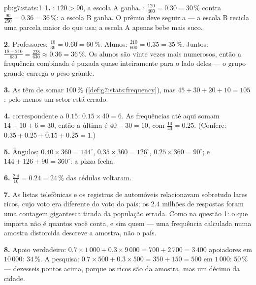 \begin{solution}{pb:g7:stats:1}
\textbf{1.} : $120 > 90$, a escola A ganha.
: $\frac{120}{400} = 0.30 = 30\,\%$ contra
$\frac{90}{250} = 0.36 = 36\,\%$: a escola B ganha. O prêmio deve
seguir a  --- a escola B recicla uma parcela maior
do que usa; a escola A apenas bebe mais suco.

\textbf{2.} Professores: $\frac{18}{30} = 0.60 = 60\,\%$. Alunos:
$\frac{210}{600} = 0.35 = 35\,\%$. Juntos:
$\frac{18 + 210}{630} = \frac{228}{630} \approx 0.36 = 36\,\%$. Os
alunos são vinte vezes mais numerosos, então a frequência combinada é
puxada quase inteiramente para o lado deles --- o grupo grande carrega
o peso grande.

\textbf{3.} As  têm de somar $100\,\%$
(\cref{def:g7:stats:frequency}), mas $45 + 30 + 20 + 10 = 105$: pelo
menos um setor está errado.

\textbf{4.}  correspondente a $0.15$:
$0.15 \times 40 = 6$. As frequências até aqui somam
$14 + 10 + 6 = 30$, então a última é $40 - 30 = 10$, com  $\frac{10}{40} = 0.25$. (Confere:
$0.35 + 0.25 + 0.15 + 0.25 = 1$.)

\textbf{5.} Ângulos: $0.40 \times 360 = 144^\circ$,
$0.35 \times 360 = 126^\circ$, $0.25 \times 360 = 90^\circ$; e
$144 + 126 + 90 = 360^\circ$: a pizza fecha.

\textbf{6.} $\frac{2.4}{10} = 0.24 = 24\,\%$ das cédulas voltaram.

\textbf{7.} As listas telefônicas e os registros de automóveis
relacionavam sobretudo lares ricos, cujo voto era diferente do voto do
país; os $2.4$ milhões de respostas foram uma contagem gigantesca
tirada da população errada. Como na questão 1: o que importa não é
quantos você conta, e sim quem --- uma frequência calculada numa
amostra distorcida descreve a amostra, não o país.

\textbf{8.} Apoio verdadeiro:
$0.7 \times 1\,000 + 0.3 \times 9\,000 = 700 + 2\,700 = 3\,400$
apoiadores em $10\,000$: $34\,\%$. A pesquisa:
$0.7 \times 500 + 0.3 \times 500 = 350 + 150 = 500$ em $1\,000$:
$50\,\%$ --- dezesseis pontos acima, porque os ricos são  da
amostra, mas um décimo da cidade.


\end{solution}
